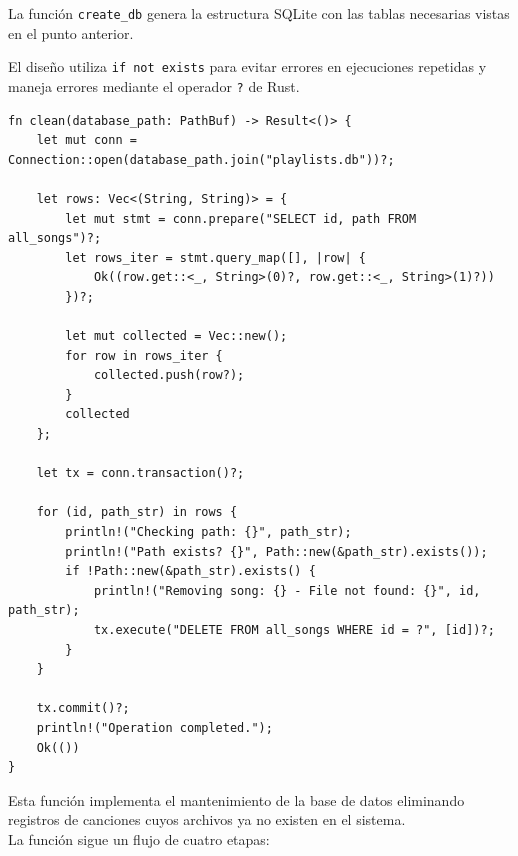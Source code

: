 \documentclass[11pt, a4paper]{article}
\begin{document}
            La función \texttt{create\_db} genera la estructura SQLite con las tablas necesarias vistas en el punto anterior.

            El diseño utiliza \texttt{if not exists} para evitar errores en ejecuciones repetidas y maneja errores mediante el operador \texttt{?} de Rust.

            \begin{lstlisting}[caption={fn clean()}]
fn clean(database_path: PathBuf) -> Result<()> {
    let mut conn = Connection::open(database_path.join("playlists.db"))?;

    let rows: Vec<(String, String)> = {
        let mut stmt = conn.prepare("SELECT id, path FROM all_songs")?;
        let rows_iter = stmt.query_map([], |row| {
            Ok((row.get::<_, String>(0)?, row.get::<_, String>(1)?))
        })?;

        let mut collected = Vec::new();
        for row in rows_iter {
            collected.push(row?);
        }
        collected
    };

    let tx = conn.transaction()?;

    for (id, path_str) in rows {
        println!("Checking path: {}", path_str);
        println!("Path exists? {}", Path::new(&path_str).exists()); 
        if !Path::new(&path_str).exists() {
            println!("Removing song: {} - File not found: {}", id, path_str);
            tx.execute("DELETE FROM all_songs WHERE id = ?", [id])?;
        }
    }

    tx.commit()?;
    println!("Operation completed.");
    Ok(())
}
            \end{lstlisting}

            Esta función implementa el mantenimiento de la base de datos eliminando registros de canciones cuyos archivos ya no existen en el sistema. \\

            La función sigue un flujo de cuatro etapas:
\end{document}
